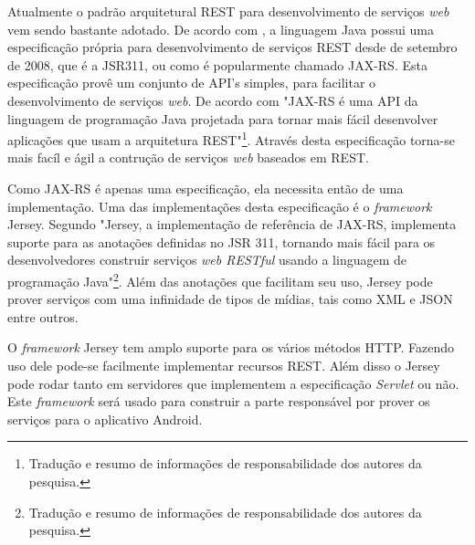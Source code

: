 
	\par Atualmente o padrão arquitetural REST para desenvolvimento de serviços
\textit{web} vem sendo bastante adotado. De acordo com
, a linguagem Java possui uma especificação
própria para desenvolvimento de serviços REST desde de setembro de 2008, que é
a JSR311, ou como é popularmente chamado JAX-RS. Esta especificação provê um
conjunto de API's simples, para facilitar o desenvolvimento de serviços
\textit{web}. De acordo com  "JAX-RS é uma API da
linguagem de programação Java projetada para tornar mais fácil
desenvolver aplicações que usam a arquitetura REST"\footnote{Tradução e resumo
de informações de responsabilidade dos autores da pesquisa.}. Através desta
especificação torna-se mais facíl e ágil a contrução de serviços \textit{web}
baseados em REST.

	\par Como JAX-RS é apenas uma especificação, ela necessita então de uma
implementação. Uma das implementações desta especificação é o
\textit{framework} Jersey. Segundo  "Jersey, a
implementação de referência de JAX-RS, implementa suporte para as anotações
definidas no JSR 311, tornando mais fácil para os desenvolvedores construir
serviços \textit{web RESTful} usando a linguagem de programação
Java"\footnote{Tradução e resumo de informações de responsabilidade
dos autores da pesquisa.}. Além das anotações que facilitam seu uso,
Jersey pode prover serviços com uma infinidade de tipos de
mídias, tais como XML e JSON entre outros.

	\par O \textit{framework} Jersey tem amplo suporte para os vários métodos
HTTP. Fazendo uso dele pode-se facilmente implementar recursos REST. Além
disso o Jersey  pode rodar tanto em servidores que implementem a
especificação \textit{Servlet} ou não. Este \textit{framework} será usado para
construir a parte responsável por prover os serviços para o aplicativo
Android.
